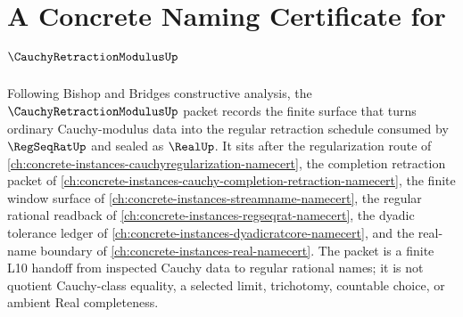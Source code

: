 \chapter{A Concrete Naming Certificate for $\CauchyRetractionModulusUp$}
\label{ch:concrete-instances-cauchy-retraction-modulus-namecert}

Following Bishop and Bridges constructive analysis, the $\CauchyRetractionModulusUp$ packet records the finite surface that turns ordinary Cauchy-modulus data into the regular retraction schedule consumed by $\RegSeqRatUp$ and sealed as $\RealUp$. It sits after the regularization route of \autoref{ch:concrete-instances-cauchyregularization-namecert}, the completion retraction packet of \autoref{ch:concrete-instances-cauchy-completion-retraction-namecert}, the finite window surface of \autoref{ch:concrete-instances-streamname-namecert}, the regular rational readback of \autoref{ch:concrete-instances-regseqrat-namecert}, the dyadic tolerance ledger of \autoref{ch:concrete-instances-dyadicratcore-namecert}, and the real-name boundary of \autoref{ch:concrete-instances-real-namecert}. The packet is a finite L10 handoff from inspected Cauchy data to regular rational names; it is not quotient Cauchy-class equality, a selected limit, trichotomy, countable choice, or ambient Real completeness.

